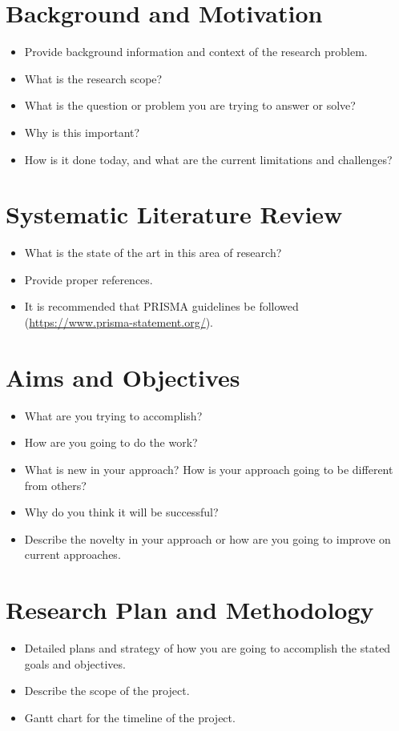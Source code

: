 \documentclass{article}
\begin{document}
\section{Background and Motivation}
\begin{itemize}
	\item Provide background information and context of the research problem.
	\item What is the research scope?
	\item What is the question or problem you are trying to answer or solve?
	\item Why is this important?
	\item How is it done today, and what are the current limitations and challenges?
\end{itemize}

\section{Systematic Literature Review}
\begin{itemize}
	\item What is the state of the art in this area of research?
	\item Provide proper references.
	\item It is recommended that PRISMA guidelines be followed (\url{https://www.prisma-statement.org/}).
\end{itemize}

\section{Aims and Objectives}
\begin{itemize}
	\item What are you trying to accomplish?
	\item How are you going to do the work?
	\item What is new in your approach? How is your approach going to be different from others?
	\item Why do you think it will be successful?
	\item Describe the novelty in your approach or how are you going to improve on current approaches.
\end{itemize}

\section{Research Plan and Methodology}
\begin{itemize}
	\item Detailed plans and strategy of how you are going to accomplish the stated goals and objectives.
	\item Describe the scope of the project.
	\item Gantt chart for the timeline of the project.
\end{itemize}
\end{document}
